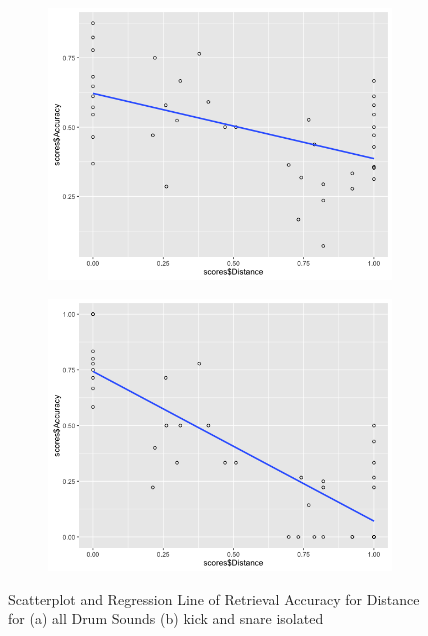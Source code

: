 \begin{figure}
\centering
\begin{subfigure}[b]{0.75\textwidth}
   \includegraphics[width=1\linewidth]{ch07_evaluation/figures/overall_correlation.png}
   \caption{}
   \label{fig:corr1} 
\end{subfigure}

\begin{subfigure}[b]{0.75\textwidth}
   \includegraphics[width=1\linewidth]{ch07_evaluation/figures/kick_snare_correlation.png}
   \caption{}
   \label{fig:corr2}
\end{subfigure}

\caption[Two numerical solutions]{Scatterplot and Regression Line of Retrieval Accuracy for Distance for (a) all Drum Sounds (b) kick and snare isolated}
\end{figure}

